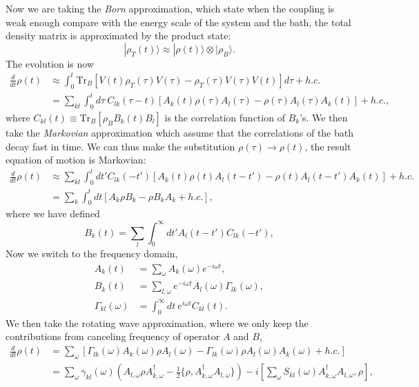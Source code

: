 \documentclass[aps,prb,superscriptaddress,nofootinbib]{revtex4}
\begin{document}
Now we are taking the \textit{Born} approximation, which state when the coupling is weak enough compare with the energy scale of the system and the bath, the total density matrix is approximated by the product state:
\begin{equation}
	|\rho_T(t)\rangle \approx |\rho(t)\rangle \otimes |\rho_B\rangle.
\end{equation}
The evolution is now
\begin{equation}
\begin{aligned}
	\frac{d}{dt} \rho(t) &\approx \int_0^t \mathrm{Tr}_B\left[ V(t) \rho_T(\tau) V(\tau)- \rho_T(\tau) V(\tau) V(t) \right]d\tau +h.c. \\
	&= \sum_{kl}\int_0^t d\tau\ C_{lk}(\tau - t) \left[A_k(t)\rho(\tau)A_l(\tau)-\rho(\tau)A_l(\tau)A_k(t)\right]+h.c.,
\end{aligned}
\end{equation}
where $C_{kl}(t) \equiv \mathrm{Tr}_B[\rho_B B_k(t) B_l ]$ is the correlation function of $B_k$'s. 
We then take the \textit{Markovian} approximation which assume that the correlations of the bath decay fast in time.
We can thus make the substitution $\rho(\tau) \rightarrow \rho(t)$, the result equation of motion is Markovian:
\begin{equation}
\begin{aligned}
	\frac{d}{dt} \rho(t) &\approx \sum_{kl}\int_{0}^{t}dt' C_{lk}(-t') \left[A_k(t)\rho(t)A_l(t-t')-\rho(t)A_l(t-t')A_k(t)\right]+h.c. \\
	&= \sum_{k} \int_0^t dt \left[A_k \rho B_{k}-\rho B_{k} A_k+h.c.\right],
\end{aligned}
\end{equation}
where we have defined
\begin{equation}
	B_{k}(t) = \sum_l \int_0^{\infty} dt' A_l(t-t')C_{lk}(-t'),
\end{equation}
Now we switch to the frequency domain,
\begin{equation}
\begin{aligned}
	A_k(t) &= \sum_\omega A_{k}(\omega) e^{-i\omega t}, \\
	B_k(t) &= \sum_{l,\omega} e^{-i\omega t} A_l(\omega)\Gamma_{lk}(\omega), \\
	\Gamma_{kl}(\omega) &= \int_0^\infty dt\ e^{i\omega t}C_{kl}(t).
\end{aligned}
\end{equation}
We then take the rotating wave approximation, where we only keep the contributions from canceling frequency of operator $A$ and $B$,
\begin{equation}
\begin{aligned}
	\frac{d}{dt}\rho(t) &= \sum_{\omega} \left[\Gamma_{lk}(\omega) A_k(\omega) \rho A_l(\omega) - \Gamma_{lk}(\omega)\rho A_l(\omega) A_k(\omega) + h.c. \right] \\
	&= \sum_{\omega} \gamma_{kl}(\omega)(A_{l,\omega}\rho A_{k,\omega}^\dagger-\frac{1}{2}\{\rho,A_{k,\omega}^\dagger A_{l,\omega}\}) -i\left[\sum_{\omega}S_{kl}(\omega)A_{k,\omega}^\dagger A_{l,\omega},\rho\right],
\end{aligned}
\end{equation}
\end{document}
